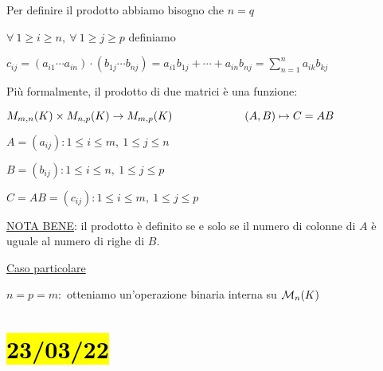 \documentclass{article}
\begin{document}
{\begin{itemize}
	      Per definire il prodotto abbiamo bisogno che $n=q$

	      $\forall\ 1\ge i\ge n,\ \forall\ 1\ge j\ge p$ definiamo

	      $c_{ij}=(a_{i1}\cdots a_{in})\cdot(b_{1j}\cdots b_{nj})=a_{i1}b_{1j}+\cdots+a_{in}b_{nj}=\sum^n_{n=1}{a_{ik}b_{kj}}$

	      Più formalmente, il prodotto di due matrici è una funzione:

	      $M_{m,n}(K)\times M_{n,p}(K)\rightarrow M_{m,p}(K)\\\hspace*{6.5em}(A,B)\mapsto C=AB$

	      $A=(a_{ij}): 1\le i\le m,\ 1\le j\le n$

	      $B=(b_{ij}): 1\le i\le n,\ 1\le j\le p$

	      $C=AB=(c_{ij}): 1\le i\le m,\ 1\le j\le p$

	      \ul{NOTA BENE}: il prodotto è definito se e solo se il numero di colonne di $A$ è uguale al numero di righe di $B$.

	      \ul{Caso particolare}

	      $n=p=m:$ otteniamo un'operazione binaria interna su $\mathcal{M}_n(K)$
\end{itemize}
}









\section{\hl{23/03/22}}
\end{document}
